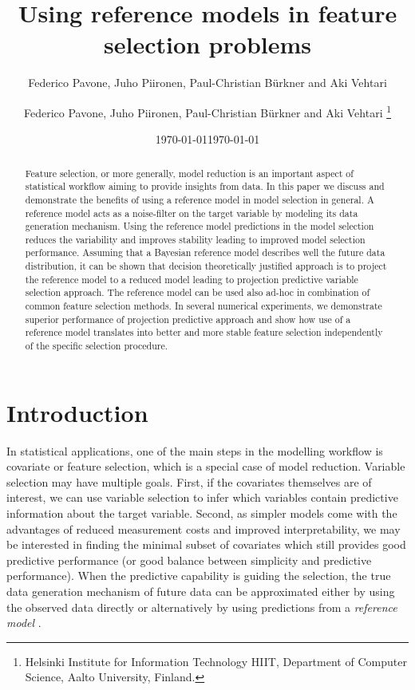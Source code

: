 \documentclass[american,]{article}
\title{Using reference models in feature selection problems 
	\vspace{.1in}}
\author{Federico Pavone, Juho Piironen, Paul-Christian B\"{u}rkner and Aki Vehtari}
\author{
    Federico Pavone, 
  Juho Piironen,
  Paul-Christian B\"{u}rkner
  and Aki Vehtari \footnote{Helsinki Institute for Information Technology HIIT,
  Department of Computer Science, Aalto University, Finland.}
  }
\date{\today}
\date{\today}
\theoremstyle{definition}
\begin{document}
\maketitle
\begin{abstract}
  Feature selection, or more generally, model reduction is an important aspect of statistical workflow aiming to provide insights from data. In this paper we discuss and demonstrate the benefits of using a reference model in model selection in general. A reference model acts as a noise-filter on the target variable by modeling its data generation mechanism. Using the reference model predictions in the model selection reduces the variability and improves stability leading to improved model selection performance. Assuming that a Bayesian reference model describes well the future data distribution, it can be shown that decision theoretically justified approach is to project the reference model to a reduced model leading to projection predictive variable selection approach. The reference model can be used also ad-hoc in combination of common feature selection methods.  In several numerical experiments, we demonstrate superior performance of projection predictive approach and show how use of a reference model translates into better and more stable feature selection independently of the specific selection procedure. 
\end{abstract}

\hypertarget{introduction}{%
\section{Introduction}\label{introduction}}

In statistical applications, one of the main steps in the modelling
workflow is covariate or feature selection, which is a special case of
model reduction. Variable selection may have multiple goals.  First,
if the covariates themselves are of interest, we can use variable
selection to infer which variables contain predictive information
about the target variable.  Second, as simpler models come with the
advantages of reduced measurement costs and improved interpretability,
we may be interested in finding the minimal subset of covariates which
still provides good predictive performance (or good balance between
simplicity and predictive performance).  When the predictive
capability is guiding the selection, the true data generation
mechanism of future data can be approximated either by using the
observed data directly or alternatively by using predictions from a
\emph{reference model} \citep{vehtari2012survey}.
\end{document}
